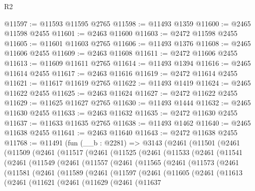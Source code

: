 \begin{lexlean}{R2}
\begin{coremodule}
@11597 := @11593 @11595 @2765
@11598 := @11493 @1359
@11600 := @2465 @11598 @2455
@11601 := @2463 @11600
@11603 := @2472 @11598 @2455
@11605 := @11601 @11603 @2765
@11606 := @11493 @1376
@11608 := @2465 @11606 @2455
@11609 := @2463 @11608
@11611 := @2472 @11606 @2455
@11613 := @11609 @11611 @2765
@11614 := @11493 @1394
@11616 := @2465 @11614 @2455
@11617 := @2463 @11616
@11619 := @2472 @11614 @2455
@11621 := @11617 @11619 @2765
@11622 := @11493 @1419
@11624 := @2465 @11622 @2455
@11625 := @2463 @11624
@11627 := @2472 @11622 @2455
@11629 := @11625 @11627 @2765
@11630 := @11493 @1444
@11632 := @2465 @11630 @2455
@11633 := @2463 @11632
@11635 := @2472 @11630 @2455
@11637 := @11633 @11635 @2765
@11638 := @11493 @1462
@11640 := @2465 @11638 @2455
@11641 := @2463 @11640
@11643 := @2472 @11638 @2455
@11768 := @11491
    (fun (__b : @2281) =>
    @3143
      (@2461
        (@11501
          (@2461
            (@11509
              (@2461
                (@11517
                  (@2461
                    (@11525
                      (@2461
                        (@11533
                          (@2461
                            (@11541
                              (@2461
                                (@11549
                                  (@2461
                                    (@11557
                                      (@2461
                                        (@11565
                                          (@2461
                                            (@11573
                                              (@2461
                                                (@11581
                                                  (@2461
                                                    (@11589
                                                      (@2461
                                                        (@11597
                                                          (@2461
                                                            (@11605
                                                              (@2461
                                                                (@11613
                                                                  (@2461
                                                                    (@11621
                                                                      (@2461
                                                                        (@11629
                                                                          (@2461
                                                                            (@11637

\end{coremodule}
\end{lexlean}
